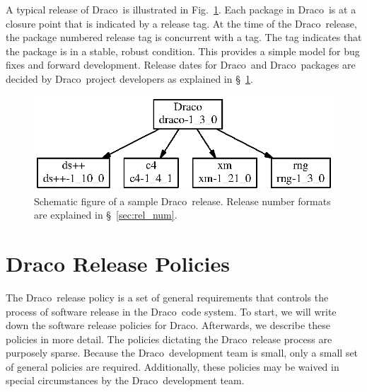 \documentclass[11pt]{nmemo}
\newcommand{\draco}{{\normalfont\normalsize\sffamily Draco}}
\begin{document}
A typical release of \draco\ is illustrated in
Fig.~\ref{fig:drelease}.  Each package in \draco\ is at a closure
point that is indicated by a release tag. At the time of the
\draco\ release, the package numbered release tag is concurrent with a
tag.  The tag indicates that the package is in a stable, robust
condition.  This provides a simple model for bug fixes and forward
development.  Release dates for \draco\ and \draco\ packages are
decided by \draco\ project developers as explained in
\S~\ref{sec:policy}.
\begin{figure}[ht!]
  \centerline{\includegraphics{drelease.eps}}
  \caption{Schematic figure of a sample \draco\ release.  Release
    number formats are explained in \S~\ref{sec:rel_num}.}
  \label{fig:drelease}
\end{figure}

 
\section{Draco Release Policies}
\label{sec:policy}

The \draco\ release policy is a set of general requirements that
controls the process of software release in the \draco\ code system.
To start, we will write down the software release policies for \draco.
Afterwards, we describe these policies in more detail.  The policies
dictating the \draco\ release process are purposely sparse.  Because
the \draco\ development team is small, only a small set of general
policies are required.  Additionally, these policies may be waived in
special circumstances by the \draco\ development team.
\end{document}
